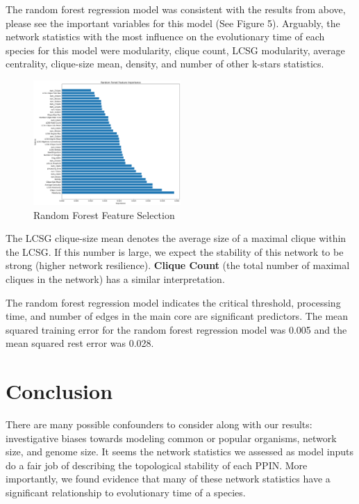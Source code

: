\documentclass[12pt]{article}
\begin{document}
The random forest regression model was consistent with the results from above, please see the important variables for this model (See Figure 5). Arguably, the network statistics with the most influence on the evolutionary time of each species for this model were modularity, clique count, LCSG modularity, average centrality, clique-size mean, density, and number of other k-stars statistics.

\begin{figure}
  \vspace{-20pt}
  \begin{center}
    \includegraphics[width=0.5\textwidth]{PPIN_fig2}
  \end{center}
  \vspace{-20pt}
  \caption{Random Forest Feature Selection}
  \vspace{-10pt}
\end{figure}

The LCSG clique-size mean denotes the average size of a maximal clique within the LCSG. If this number is large, we expect the stability of this network to be strong (higher network resilience). \textbf{Clique Count} (the total number of maximal cliques in the network) has a similar interpretation.

The random forest regression model indicates the critical threshold, processing time, and number of edges in the main core are significant predictors. The mean squared training error for the random forest regression model was 0.005 and the mean squared rest error was 0.028.
\newline

\section{Conclusion}
There are many possible confounders to consider along with our results: investigative biases towards modeling common or popular organisms, network size, and genome size. It seems the network statistics we assessed as model inputs do a fair job of describing the topological stability of each PPIN. More importantly, we found evidence that many of these network statistics have a significant relationship to evolutionary time of a species.
\end{document}
